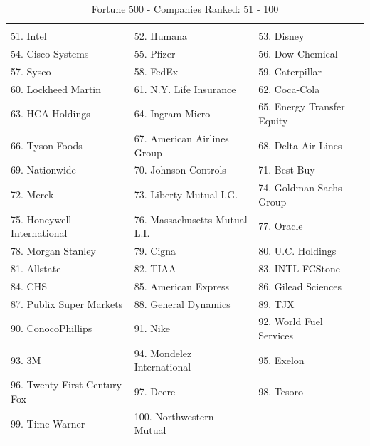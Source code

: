 \documentclass{article}
\begin{document}
\begin{table}[H]
\centering
\caption{Fortune 500 - Companies Ranked: 51 - 100}
\begin{tabular}{lll}
\hline
 & & \\
51. Intel
& 52. Humana
& 53. Disney
 \\ 
 54. Cisco Systems
& 55. Pfizer
& 56. Dow Chemical
 \\ 
57. Sysco
& 58. FedEx
& 59. Caterpillar
 \\ 
60. Lockheed Martin
& 61. N.Y. Life Insurance
& 62. Coca-Cola
 \\ 
63. HCA Holdings
& 64. Ingram Micro
& 65. Energy Transfer Equity
 \\ 
66. Tyson Foods
& 67. American Airlines Group
& 68. Delta Air Lines
 \\ 
69. Nationwide
& 70. Johnson Controls
& 71. Best Buy
 \\ 
72. Merck
& 73. Liberty Mutual I.G.
& 74. Goldman Sachs Group
 \\ 
75. Honeywell International
& 76. Massachusetts Mutual L.I.
& 77. Oracle
 \\ 
78. Morgan Stanley
& 79. Cigna
& 80. U.C. Holdings
 \\ 
81. Allstate
& 82. TIAA
& 83. INTL FCStone
 \\ 
84. CHS
& 85. American Express
& 86. Gilead Sciences
 \\ 
87. Publix Super Markets
& 88. General Dynamics
& 89. TJX
 \\ 
90. ConocoPhillips
& 91. Nike
& 92. World Fuel Services
 \\ 
93. 3M
& 94. Mondelez International
& 95. Exelon
 \\ 
96. Twenty-First Century Fox
& 97. Deere
& 98. Tesoro
 \\ 
99. Time Warner
& 100. Northwestern Mutual
 &
 \\ \hline

\end{tabular}
\end{table}
\end{document}
